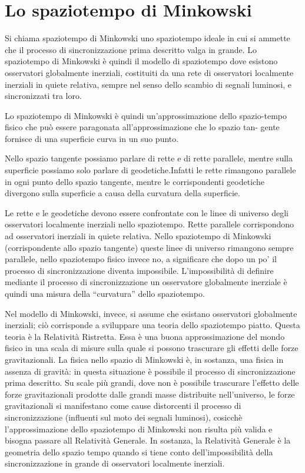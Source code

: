 \section{Lo spaziotempo di Minkowski}
Si chiama spaziotempo di Minkowski uno spaziotempo ideale in cui si ammette 
che il processo di sincronizzazione prima descritto valga in grande. Lo
spaziotempo di Minkowski è quindi il modello di spaziotempo dove esistono
osservatori globalmente inerziali, costituiti da una rete di osservatori localmente inerziali 
in quiete relativa, sempre nel senso dello scambio di segnali
luminosi, e sincronizzati tra loro.

Lo spaziotempo di Minkowski è quindi un'approssimazione dello spazio-tempo fisico 
che può essere paragonata all'approssimazione che lo spazio tan-
gente fornisce di una superficie curva in un suo punto.

Nello spazio tangente possiamo parlare di rette e di rette parallele, mentre
sulla superficie possiamo solo parlare di geodetiche.Infatti le rette rimangono parallele 
in ogni punto dello spazio tangente, mentre le corrispondenti
geodetiche divergono sulla superficie a causa della curvatura della superficie.

Le rette e le geodetiche devono essere confrontate con le linee di universo degli
osservatori localmente inerziali nello spaziotempo. Rette parallele corrispon\-dono
ad osservatori inerziali in quiete relativa. Nello spaziotempo di Minkowski 
(corrispondente allo spazio tangente) queste linee di universo rimangono
sempre parallele, nello spaziotempo fisico invece no, a significare che dopo
un po' il processo di sincronizzazione diventa impossibile. L'impossibilità di
definire mediante il processo di sincronizzazione un osservatore globalmente
inerziale è quindi una misura della ``curvatura'' dello spaziotempo.

Nel modello di Minkowski, invece, si assume che esistano osservatori globalmente inerziali; 
ciò corrisponde a sviluppare una teoria dello spaziotempo
piatto. Questa teoria è la Relatività Ristretta. Essa è una buona approssimazione 
del mondo fisico in una scala di misure sulla quale si possono
trascurare gli effetti delle forze gravitazionali. La fisica nello spazio di Minkowski 
è, in sostanza, una fisica in assenza di gravità: in questa situazione è
possibile il processo di sincronizzazione prima descritto.
Su scale più grandi, dove non è possibile trascurare l'effetto delle forze
gravitazionali prodotte dalle grandi masse distribuite nell'universo, le forze
gravitazionali si manifestano come cause distorcenti il processo di sincronizzazione 
(influenti sul moto dei segnali luminosi), cosicchè l'approssimazione
dello spaziotempo di Minkowski non risulta più valida e bisogna passare all Relatività Generale. 
In sostanza, la Relatività Generale è la geometria dello spazio tempo quando si 
tiene conto dell'impossibilità della sincronizzazione in grande di osservatori
localmente inerziali.

